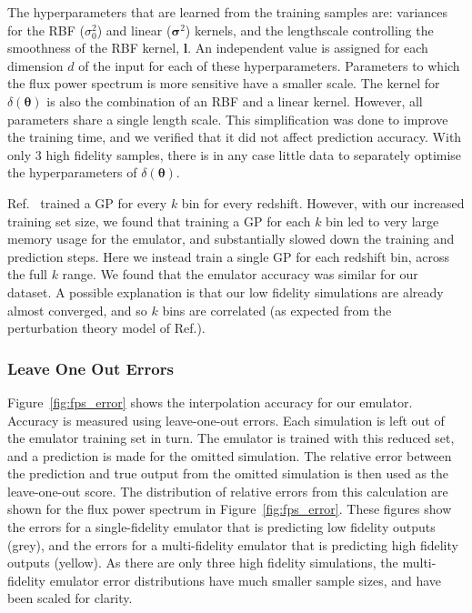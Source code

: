 \documentclass[a4paper,11pt]{article}
\begin{document}
The hyperparameters that are learned from the training samples are: variances for the RBF ($\sigma_0^2$) and  linear ($\boldsymbol{\sigma}^2$) kernels, and the lengthscale controlling the smoothness of the RBF kernel, $\boldsymbol{l}$. An independent value is assigned for each dimension $d$ of the input for each of these hyperparameters. Parameters to which the flux power spectrum is more sensitive have a smaller scale. The kernel for $\delta(\boldsymbol{\theta})$ is also the combination of an RBF and a linear kernel. However, all parameters share a single length scale. This simplification was done to improve the training time, and we verified that it did not affect prediction accuracy. With only $3$ high fidelity samples, there is in any case little data to separately optimise the hyperparameters of $\delta(\boldsymbol{\theta})$.

Ref.~\cite{Fernandez:2022} trained a GP for every $k$ bin for every redshift. However, with our increased training set size, we found that training a GP for each $k$ bin led to very large memory usage for the emulator, and substantially slowed down the training and prediction steps. Here we instead train a single GP for each redshift bin, across the full $k$ range. We found that the emulator accuracy was similar for our dataset. A possible explanation is that our low fidelity simulations are already almost converged, and so $k$ bins are correlated (as expected from the perturbation theory model of Ref.\cite{Irsic:2018}).


\subsubsection{Leave One Out Errors}

Figure~\ref{fig:fps_error} shows the interpolation accuracy for our emulator. Accuracy is measured using leave-one-out errors. Each simulation is left out of the emulator training set in turn. The emulator is trained with this reduced set, and a prediction is made for the omitted simulation. The relative error between the prediction and true output from the omitted simulation is then used as the leave-one-out score.
The distribution of relative errors from this calculation are shown for the flux power spectrum in Figure~\ref{fig:fps_error}.
These figures show the errors for a single-fidelity emulator that is predicting low fidelity outputs (grey), and the errors for a multi-fidelity emulator that is predicting high fidelity outputs (yellow). As there are only three high fidelity simulations, the multi-fidelity emulator error distributions have much smaller sample sizes, and have been scaled for clarity.
\end{document}
